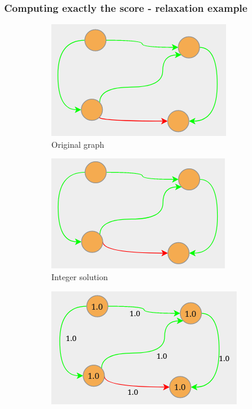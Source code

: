 \documentclass{beamer}
\begin{document}
\begin{frame}[c]
	\frametitle{Computing exactly the score - relaxation example}
	\begin{figure}
		\begin{center}
			\begin{subfigure}[b]{0.3\textwidth}
				\centering
				\includegraphics[width=\textwidth]{img/graph-example3-1.png}
				\caption{Original graph}
				\label{fig:img/graph-example3-1.png}
			\end{subfigure}
			\begin{subfigure}[b]{0.3\textwidth}
				\centering
				\includegraphics[width=\textwidth]{img/graph-example3-2.png}
				\caption{Integer solution}
				\label{fig:img/graph-example3-2.png}
			\end{subfigure}
			\begin{subfigure}[b]{0.3\textwidth}
				\centering
				\includegraphics[width=\textwidth]{img/graph-example3-3.png}

\end{subfigure}
\end{center}
\end{figure}
\end{frame}
\end{document}
